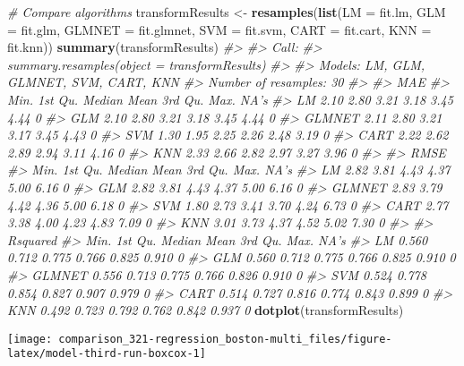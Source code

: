 \documentclass[]{book}
\newenvironment{Shaded}{\begin{snugshade}}{\end{snugshade}}
\newcommand{\CommentTok}[1]{\textcolor[rgb]{0.56,0.35,0.01}{\textit{#1}}}
\newcommand{\DataTypeTok}[1]{\textcolor[rgb]{0.13,0.29,0.53}{#1}}
\newcommand{\KeywordTok}[1]{\textcolor[rgb]{0.13,0.29,0.53}{\textbf{#1}}}
\newcommand{\NormalTok}[1]{#1}
\newcommand{\StringTok}[1]{\textcolor[rgb]{0.31,0.60,0.02}{#1}}
\begin{document}
\begin{Shaded}
\begin{Highlighting}[]
\CommentTok{# Compare algorithms}
\NormalTok{transformResults <-}\StringTok{ }\KeywordTok{resamples}\NormalTok{(}\KeywordTok{list}\NormalTok{(}\DataTypeTok{LM     =}\NormalTok{ fit.lm, }
                                  \DataTypeTok{GLM    =}\NormalTok{ fit.glm, }
                                  \DataTypeTok{GLMNET =}\NormalTok{ fit.glmnet, }
                                  \DataTypeTok{SVM    =}\NormalTok{ fit.svm, }
                                  \DataTypeTok{CART   =}\NormalTok{ fit.cart, }
                                  \DataTypeTok{KNN    =}\NormalTok{ fit.knn))}
\KeywordTok{summary}\NormalTok{(transformResults)}
\CommentTok{#> }
\CommentTok{#> Call:}
\CommentTok{#> summary.resamples(object = transformResults)}
\CommentTok{#> }
\CommentTok{#> Models: LM, GLM, GLMNET, SVM, CART, KNN }
\CommentTok{#> Number of resamples: 30 }
\CommentTok{#> }
\CommentTok{#> MAE }
\CommentTok{#>        Min. 1st Qu. Median Mean 3rd Qu. Max. NA's}
\CommentTok{#> LM     2.10    2.80   3.21 3.18    3.45 4.44    0}
\CommentTok{#> GLM    2.10    2.80   3.21 3.18    3.45 4.44    0}
\CommentTok{#> GLMNET 2.11    2.80   3.21 3.17    3.45 4.43    0}
\CommentTok{#> SVM    1.30    1.95   2.25 2.26    2.48 3.19    0}
\CommentTok{#> CART   2.22    2.62   2.89 2.94    3.11 4.16    0}
\CommentTok{#> KNN    2.33    2.66   2.82 2.97    3.27 3.96    0}
\CommentTok{#> }
\CommentTok{#> RMSE }
\CommentTok{#>        Min. 1st Qu. Median Mean 3rd Qu. Max. NA's}
\CommentTok{#> LM     2.82    3.81   4.43 4.37    5.00 6.16    0}
\CommentTok{#> GLM    2.82    3.81   4.43 4.37    5.00 6.16    0}
\CommentTok{#> GLMNET 2.83    3.79   4.42 4.36    5.00 6.18    0}
\CommentTok{#> SVM    1.80    2.73   3.41 3.70    4.24 6.73    0}
\CommentTok{#> CART   2.77    3.38   4.00 4.23    4.83 7.09    0}
\CommentTok{#> KNN    3.01    3.73   4.37 4.52    5.02 7.30    0}
\CommentTok{#> }
\CommentTok{#> Rsquared }
\CommentTok{#>         Min. 1st Qu. Median  Mean 3rd Qu.  Max. NA's}
\CommentTok{#> LM     0.560   0.712  0.775 0.766   0.825 0.910    0}
\CommentTok{#> GLM    0.560   0.712  0.775 0.766   0.825 0.910    0}
\CommentTok{#> GLMNET 0.556   0.713  0.775 0.766   0.826 0.910    0}
\CommentTok{#> SVM    0.524   0.778  0.854 0.827   0.907 0.979    0}
\CommentTok{#> CART   0.514   0.727  0.816 0.774   0.843 0.899    0}
\CommentTok{#> KNN    0.492   0.723  0.792 0.762   0.842 0.937    0}
\KeywordTok{dotplot}\NormalTok{(transformResults)}
\end{Highlighting}
\end{Shaded}

\begin{center}\texttt{[image: comparison\_321-regression\_boston-multi\_files/figure-latex/model-third-run-boxcox-1]} \end{center}
\end{document}
